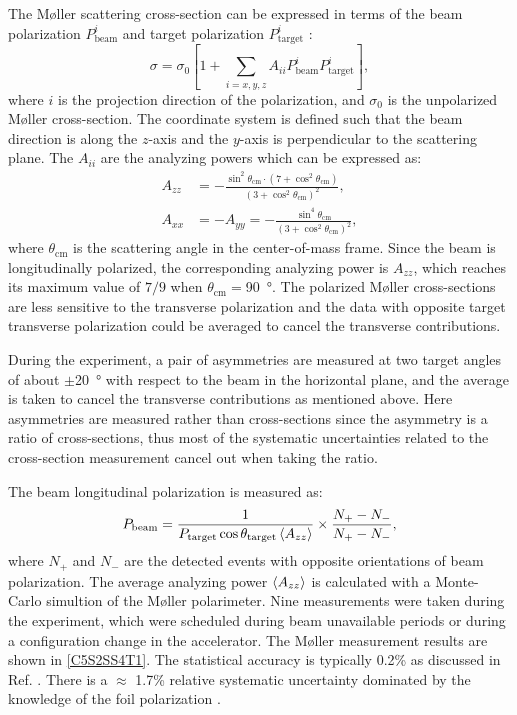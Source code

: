 The M{\o}ller scattering cross-section can be expressed in terms of the beam polarization $P_{\mathrm{beam}}^i$ and target polarization $P_{\mathrm{target}}^i$ \cite{Alcorn2004}:
\begin{equation} \label{C5S2SS4E1}
\sigma = \sigma_0\left[1+\sum_{i=x,y,z}A_{ii}P_{\mathrm{beam}}^iP_{\mathrm{target}}^i\right],
\end{equation}
where $i$ is the projection direction of the polarization, and $\sigma_0$ is the unpolarized M{\o}ller cross-section. The coordinate system is defined such that the beam direction is along the $z$-axis and the $y$-axis is perpendicular to the scattering plane. The $A_{ii}$ are the analyzing powers which can be expressed as:
\begin{align} \label{C5S2SS4E2}
A_{zz} & = -\frac{\sin^2\theta_{\mathrm{cm}}\cdot(7+\cos^2\theta_{\mathrm{cm}})}{(3+\cos^2\theta_{\mathrm{cm}})^2}, \\ \label{C5S2SS4E3}
A_{xx} & = -A_{yy} =  -\frac{\sin^4\theta_{\mathrm{cm}}}{(3+\cos^2\theta_{\mathrm{cm}})^2},
\end{align}
where $\theta_{\mathrm{cm}}$ is the scattering angle in the center-of-mass frame. Since the beam is longitudinally polarized, the corresponding analyzing power is $A_{zz}$, which reaches its maximum value of $7/9$ when $\theta_{\mathrm{cm}}=$\SI{90}{\degree}. The polarized M{\o}ller cross-sections are less sensitive to the transverse polarization and the data with opposite target transverse polarization could be averaged to cancel the transverse contributions.

During the experiment, a pair of asymmetries are measured at two target angles of about $\pm$\SI{20}{\degree} with respect to the beam in the horizontal plane, and the average is taken to cancel the transverse contributions as mentioned above. Here asymmetries are measured rather than cross-sections since the asymmetry is a ratio of cross-sections, thus most of the systematic uncertainties related to the cross-section measurement cancel out when taking the ratio.

The beam longitudinal polarization is measured as:
\begin{equation} \label{C5S2SS4E4}
P_{\mathrm{beam}} = \frac{1}{P_{\mathrm{target}}\cos\theta_{\mathrm{target}}\expval{A_{zz}}}\times\frac{N_+-N_-}{N_+-N_-},
\end{equation}
where $N_+$ and $N_-$ are the detected events with opposite orientations of beam polarization. The average analyzing power $\expval{A_{zz}}$ is  calculated with a Monte-Carlo simultion of the M{\o}ller polarimeter. Nine measurements were taken during the experiment, which were scheduled during beam unavailable periods or during a configuration change in the accelerator. The M{\o}ller measurement results are shown in \cref{C5S2SS4T1}. The statistical accuracy is typically 0.2\% as discussed in Ref. \cite{Alcorn2004}. There is a $\approx$ 1.7\% relative systematic uncertainty dominated by the knowledge of the foil polarization \cite{MOLLER}.

